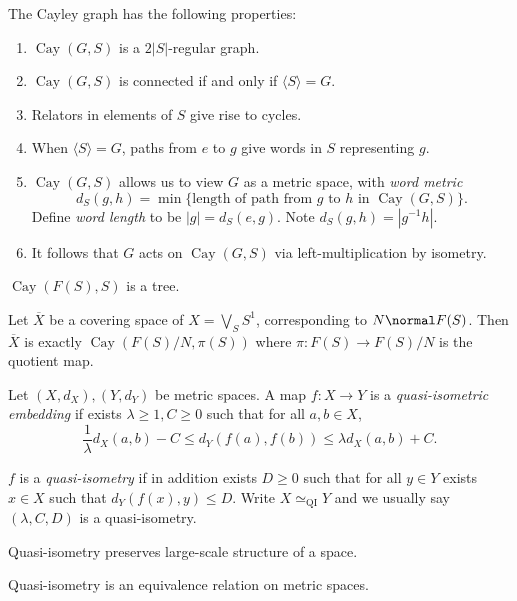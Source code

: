 \documentclass[a4paper]{article}
\DeclareMathOperator{\Cay}{Cay} %
\begin{document}
The Cayley graph has the following properties:
\begin{enumerate}
\item \(\Cay(G, S)\) is a \(2|S|\)-regular graph.
\item \(\Cay(G, S)\) is connected if and only if \(\langle S\rangle = G\).
\item Relators in elements of \(S\) give rise to cycles.
\item When \(\langle S\rangle = G\), paths from \(e\) to \(g\) give words in \(S\) representing \(g\).
\item \(\Cay(G, S)\) allows us to view \(G\) as a metric space, with \emph{word metric}
  \[
    d_S(g, h) = \min\{\text{length of path from \(g\) to \(h\) in \(\Cay(G, S)\)}\}.
  \]
  Define \emph{word length} to be \(|g| = d_S(e, g)\). Note \(d_S(g, h) = |g^{-1}h|\).
\item It follows that \(G\) acts on \(\Cay(G, S)\) via left-multiplication by isometry.
\end{enumerate}

\begin{theorem}
  \(\Cay(F(S), S)\) is a tree.
\end{theorem}

Let \(\overline X\) be a covering space of \(X = \bigvee_S S^1\), corresponding to \(N \normal F(S)\). Then \(\overline X\) is exactly \(\Cay(F(S)/N, \pi(S))\) where \(\pi: F(S) \to F(S)/N\) is the quotient map.

\begin{definition}
  Let \((X, d_X), (Y, d_Y)\) be metric spaces. A map \(f: X \to Y\) is a \emph{quasi-isometric embedding} if exists \(\lambda \geq 1, C \geq 0\) such that for all \(a, b \in X\),
  \[
    \frac{1}{\lambda} d_X(a, b) - C \leq d_Y(f(a), f(b)) \leq \lambda d_X(a, b) + C.
  \]

  \(f\) is a \emph{quasi-isometry} if in addition exists \(D \geq 0\) such that for all \(y \in Y\) exists \(x \in X\) such that \(d_Y(f(x), y) \leq D\). Write \(X \simeq_{\mathrm{QI}} Y\) and we usually say \((\lambda, C, D)\) is a quasi-isometry.
\end{definition}

Quasi-isometry preserves large-scale structure of a space.

\begin{proposition}
  Quasi-isometry is an equivalence relation on metric spaces.
\end{proposition}
\end{document}
